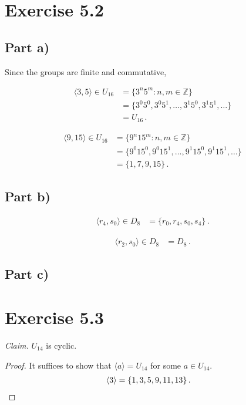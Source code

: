 \documentclass{abrice}
\newcommand{\Z}{\mathbb{Z}}
\begin{document}
\section{Exercise 5.2}

\subsection{Part a)}

Since the groups are finite and commutative,

\begin{align*}
  \langle 3, 5 \rangle \in U_{16}
  & = \{ 3^n 5^m : n, m \in \Z \} \\
  & = \{ 3^0 5^0, 3^0 5^1, \ldots, 3^1 5^{0}, 3^1 5^1, \ldots \} \\
  & = U_{16}\, .
\end{align*}

\begin{align*}
  \langle 9, 15 \rangle \in U_{16}
  & = \{ 9^n 15^m : n,m \in \Z \} \\
  & = \{ 9^0 15^0, 9^0 15^1, \ldots, 9^1 15^0, 9^1 15^1, \ldots \} \\
  & = \{ 1, 7, 9, 15 \}\, .
\end{align*}

\subsection{Part b)}

\begin{align*}
  \langle r_4, s_0 \rangle \in D_8
  & = \{ r_0, r_4, s_0, s_4 \}\, .
\end{align*}

\begin{align*}
  \langle r_2, s_0 \rangle \in D_8
  & = D_8\, .
\end{align*}

\subsection{Part c)}

\section{Exercise 5.3}

\textit{Claim.} $U_{14}$ is cyclic.

\begin{proof}
  It suffices to show that $\langle a \rangle = U_{14}$ for some $a \in
  U_{14}$.
  \begin{align*}
    & \langle 3 \rangle = \{ 1, 3, 5, 9, 11, 13\}\, . \qedhere
  \end{align*}
\end{proof}
\end{document}
